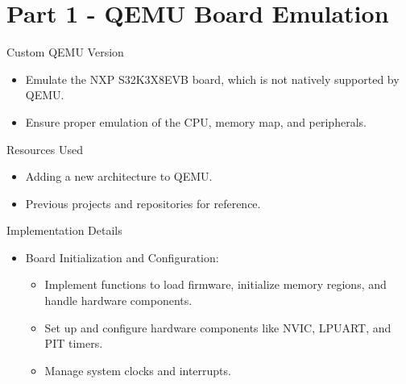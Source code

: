 
\section{Part 1 - QEMU Board Emulation}

\begin{frame}{Custom QEMU Version}
    \begin{itemize}
        \item Emulate the NXP S32K3X8EVB board, which is not natively supported by QEMU.
        \item Ensure proper emulation of the CPU, memory map, and peripherals.
    \end{itemize}
\end{frame}

\begin{frame}{Resources Used}
    \begin{itemize}
        \item Adding a new architecture to QEMU.
        \item Previous projects and repositories for reference.
    \end{itemize}
\end{frame}

\begin{frame}{Implementation Details}
    \begin{itemize}
        \item Board Initialization and Configuration:
        \begin{itemize}
            \item Implement functions to load firmware, initialize memory regions, and handle hardware components.
            \item Set up and configure hardware components like NVIC, LPUART, and PIT timers.
            \item Manage system clocks and interrupts.
        \end{itemize}
    \end{itemize}
\end{frame}

